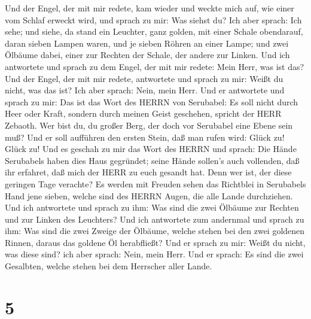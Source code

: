  Und der Engel, der mit mir redete, kam wieder und weckte
mich auf, wie einer vom Schlaf erweckt wird,  und sprach zu
mir: Was siehst du? Ich aber sprach: Ich sehe; und siehe, da stand ein
Leuchter, ganz golden, mit einer Schale obendarauf, daran sieben Lampen
waren, und je sieben Röhren an einer Lampe;  und zwei
Ölbäume dabei, einer zur Rechten der Schale, der andere zur Linken.
 Und ich antwortete und sprach zu dem Engel, der mit mir
redete: Mein Herr, was ist das?  Und der Engel, der mit mir
redete, antwortete und sprach zu mir: Weißt du nicht, was das ist? Ich
aber sprach: Nein, mein Herr.  Und er antwortete und sprach
zu mir: Das ist das Wort des HERRN von Serubabel: Es soll nicht durch
Heer oder Kraft, sondern durch meinen Geist geschehen, spricht der HERR
Zebaoth.  Wer bist du, du großer Berg, der doch vor
Serubabel eine Ebene sein muß? Und er soll aufführen den ersten Stein,
daß man rufen wird: Glück zu! Glück zu!  Und es geschah zu
mir das Wort des HERRN und sprach:  Die Hände Serubabels
haben dies Haus gegründet; seine Hände sollen's auch vollenden, daß ihr
erfahret, daß mich der HERR zu euch gesandt hat.  Denn wer
ist, der diese geringen Tage verachte? Es werden mit Freuden sehen das
Richtblei in Serubabels Hand jene sieben, welche sind des HERRN Augen,
die alle Lande durchziehen.  Und ich antwortete und sprach
zu ihm: Was sind die zwei Ölbäume zur Rechten und zur Linken des
Leuchters?  Und ich antwortete zum andernmal und sprach zu
ihm: Was sind die zwei Zweige der Ölbäume, welche stehen bei den zwei
goldenen Rinnen, daraus das goldene Öl herabfließt?  Und er
sprach zu mir: Weißt du nicht, was diese sind? ich aber sprach: Nein,
mein Herr.  Und er sprach: Es sind die zwei Gesalbten,
welche stehen bei dem Herrscher aller Lande.

\hypertarget{section-4}{%
\section{5}\label{section-4}}

